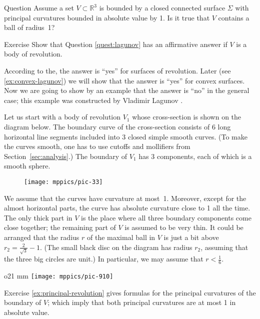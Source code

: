 \begin{thm}{Question}\label{quest:lagunov}
Assume a set $V\subset \mathbb{R}^3$ is bounded by a closed connected surface $\Sigma$ with 
principal curvatures bounded in absolute value by 1.
Is it true that $V$ contains a ball of radius~1?
\end{thm}

\begin{thm}{Exercise}\label{ex:moon-revolution}
Show that Question \ref{quest:lagunov} has an affirmative answer if $V$ is a body of revolution.
\end{thm}

According to the, the answer is ``yes'' for surfaces of revolution.
Later (see \ref{ex:convex-lagunov})
we will show that the answer is ``yes'' for convex surfaces.
Now we are going to show by an example that the answer is ``no'' in the general case;
this example was constructed by Vladimir Lagunov \cite{lagunov-1961}.

Let us start with a body of revolution $V_1$ whose cross-section is shown on the diagram below.
The boundary curve of the cross-section consists of 6 long horizontal line segments included into 3 closed simple smooth curves.
(To make the curves smooth, one has to use cutoffs and mollifiers from Section~\ref{sec:analysis}.)
The boundary of $V_1$ has 3 components, each of which is a smooth sphere.

\begin{figure}[h!]
\centering
\texttt{[image: mppics/pic-33]}
\vskip0mm
\end{figure}

We assume that the curves have curvature at most~1.
Moreover, except for the almost horizontal parts, the curve has absolute curvature close to 1 all the time.
The only thick part in $V$ is the place where all three boundary components come close together;
the remaining part of $V$ is assumed to be very thin.
It could be arranged that the radius $r$ of the maximal ball in $V$ is just a bit above 
$r_2=\tfrac2{\sqrt{3}}-1$.
(The small black disc on the diagram has radius $r_2$,
assuming that the three big circles are unit.)
In particular, we may assume that $r<\tfrac16$.

\begin{wrapfigure}{o}{21 mm}
\vskip-1mm
\centering
\texttt{[image: mppics/pic-910]}
\vskip0mm
\end{wrapfigure}

Exercise \ref{ex:principal-revolution} gives formulas for the principal curvatures of the boundary of $V$;
which imply that both principal curvatures are at most 1 in absolute value. 


